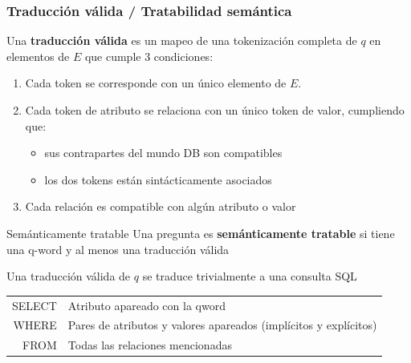 




\begin{frame}[<+->] \fontsize{9.5pt}{8.2}\selectfont
    \frametitle{Traducción válida / Tratabilidad semántica}    
     Una \textbf{traducción válida} es un mapeo de una tokenización completa de $q$ en elementos de $E$ que cumple 3 condiciones:
    \begin{enumerate}
      \item Cada token se corresponde con un único elemento de $E$.
      \item Cada token de atributo se relaciona con un único token de valor, cumpliendo que:
      \begin{itemize}
        \fontsize{9.5pt}{7.2}\selectfont
        \item sus contrapartes del mundo DB son compatibles
        \item los dos tokens están sintácticamente asociados %
       \end{itemize}
      \item Cada relación es compatible con algún atributo o valor
    \end{enumerate}

  \begin{alertblock}{Semánticamente tratable}
    Una pregunta es \textbf{semánticamente tratable} si tiene una q-word y al menos una traducción válida
  \end{alertblock}

    \begin{block}{Una traducción válida de $q$ se traduce trivialmente a una consulta SQL}        
    \begin{tabular}{ r | l }
    SELECT &  Atributo apareado con la qword \\
    WHERE & Pares de atributos y valores apareados (implícitos y explícitos)\\
    FROM & Todas las relaciones mencionadas \\
    \end{tabular}
    \end{block}



\end{frame}

